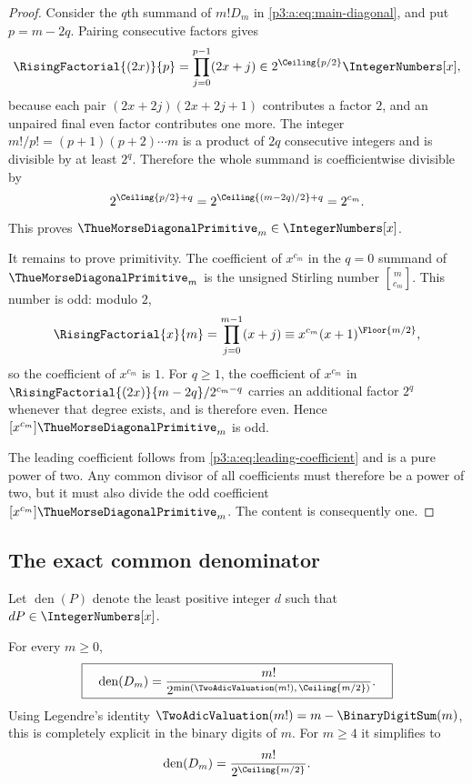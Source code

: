 \documentclass[11pt,oneside]{article}
\numberwithin{equation}{section}
\theoremstyle{definition}
\theoremstyle{remark}
\begin{document}
\begin{proof}
Consider the $q$th summand of $m!D_m$ in
\eqref{p3:a:eq:main-diagonal}, and put $p=m-2q$.  Pairing consecutive factors gives
\[
 \RisingFactorial{(2x)}{p}
 =\prod_{j=0}^{p-1}(2x+j)
 \in 2^{\Ceiling{p/2}}\IntegerNumbers[x],
\]
because each pair $(2x+2j)(2x+2j+1)$ contributes a factor $2$, and an
unpaired final even factor contributes one more.  The integer
$m!/p!=(p+1)(p+2)\cdots m$ is a product of $2q$ consecutive integers and is
divisible by at least $2^q$.  Therefore the whole summand is coefficientwise
divisible by
\[
 2^{\Ceiling{p/2}+q}
 =2^{\Ceiling{(m-2q)/2}+q}
 =2^{c_m}.
\]
This proves $\ThueMorseDiagonalPrimitive_m\in\IntegerNumbers[x]$.

It remains to prove primitivity.  The coefficient of $x^{c_m}$ in the
$q=0$ summand of $\ThueMorseDiagonalPrimitive_m$ is the unsigned Stirling number
$\genfrac{[}{]}{0pt}{}{m}{c_m}$.  This number is odd: modulo $2$,
\[
 \RisingFactorial{x}{m}=\prod_{j=0}^{m-1}(x+j)
 \equiv x^{c_m}(x+1)^{\Floor{m/2}},
\]
so the coefficient of $x^{c_m}$ is $1$.  For $q\ge1$, the coefficient of
$x^{c_m}$ in
$\RisingFactorial{(2x)}{m-2q}/2^{c_m-q}$ carries an additional factor $2^q$ whenever
that degree exists, and is therefore even.  Hence $[x^{c_m}]\ThueMorseDiagonalPrimitive_m$ is odd.

The leading coefficient follows from \eqref{p3:a:eq:leading-coefficient} and is a pure power
of two.  Any common divisor of all coefficients must therefore be a power of
two, but it must also divide the odd coefficient $[x^{c_m}]\ThueMorseDiagonalPrimitive_m$.  The content
is consequently one.
\end{proof}

\subsection{The exact common denominator}

Let $\operatorname{den}(P)$ denote the least positive integer $d$ such that
$dP\in\IntegerNumbers[x]$.

\begin{corollary}
\label{p3:b:cor:denominator}
For every $m\ge0$,
\begin{equation}
 \boxed{\quad
 \operatorname{den}(D_m)
 =\frac{m!}{2^{\min(\TwoAdicValuation(m!),\,\Ceiling{m/2})}}.
 \quad}
 \label{p3:b:eq:denominator}
\end{equation}
Using Legendre's identity $\TwoAdicValuation(m!)=m-\BinaryDigitSum(m)$, this is completely
explicit in the binary digits of $m$.  For $m\ge4$ it simplifies to
\begin{equation}
 \operatorname{den}(D_m)=\frac{m!}{2^{\Ceiling{m/2}}}.
 \label{p3:b:eq:denominator-large}
\end{equation}
\end{corollary}
\end{document}
